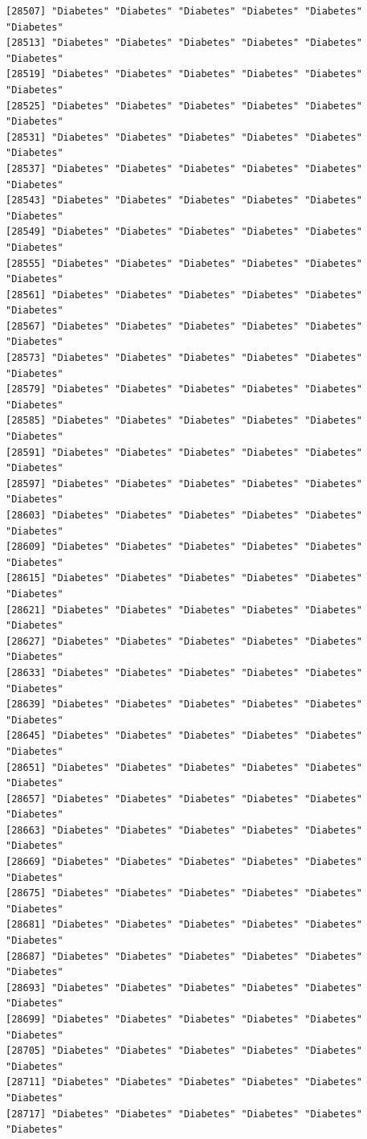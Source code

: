 \documentclass[
  letterpaper,
  DIV=11,
  numbers=noendperiod]{scrartcl}
\begin{document}
\begin{verbatim}
[28507] "Diabetes" "Diabetes" "Diabetes" "Diabetes" "Diabetes" "Diabetes"
[28513] "Diabetes" "Diabetes" "Diabetes" "Diabetes" "Diabetes" "Diabetes"
[28519] "Diabetes" "Diabetes" "Diabetes" "Diabetes" "Diabetes" "Diabetes"
[28525] "Diabetes" "Diabetes" "Diabetes" "Diabetes" "Diabetes" "Diabetes"
[28531] "Diabetes" "Diabetes" "Diabetes" "Diabetes" "Diabetes" "Diabetes"
[28537] "Diabetes" "Diabetes" "Diabetes" "Diabetes" "Diabetes" "Diabetes"
[28543] "Diabetes" "Diabetes" "Diabetes" "Diabetes" "Diabetes" "Diabetes"
[28549] "Diabetes" "Diabetes" "Diabetes" "Diabetes" "Diabetes" "Diabetes"
[28555] "Diabetes" "Diabetes" "Diabetes" "Diabetes" "Diabetes" "Diabetes"
[28561] "Diabetes" "Diabetes" "Diabetes" "Diabetes" "Diabetes" "Diabetes"
[28567] "Diabetes" "Diabetes" "Diabetes" "Diabetes" "Diabetes" "Diabetes"
[28573] "Diabetes" "Diabetes" "Diabetes" "Diabetes" "Diabetes" "Diabetes"
[28579] "Diabetes" "Diabetes" "Diabetes" "Diabetes" "Diabetes" "Diabetes"
[28585] "Diabetes" "Diabetes" "Diabetes" "Diabetes" "Diabetes" "Diabetes"
[28591] "Diabetes" "Diabetes" "Diabetes" "Diabetes" "Diabetes" "Diabetes"
[28597] "Diabetes" "Diabetes" "Diabetes" "Diabetes" "Diabetes" "Diabetes"
[28603] "Diabetes" "Diabetes" "Diabetes" "Diabetes" "Diabetes" "Diabetes"
[28609] "Diabetes" "Diabetes" "Diabetes" "Diabetes" "Diabetes" "Diabetes"
[28615] "Diabetes" "Diabetes" "Diabetes" "Diabetes" "Diabetes" "Diabetes"
[28621] "Diabetes" "Diabetes" "Diabetes" "Diabetes" "Diabetes" "Diabetes"
[28627] "Diabetes" "Diabetes" "Diabetes" "Diabetes" "Diabetes" "Diabetes"
[28633] "Diabetes" "Diabetes" "Diabetes" "Diabetes" "Diabetes" "Diabetes"
[28639] "Diabetes" "Diabetes" "Diabetes" "Diabetes" "Diabetes" "Diabetes"
[28645] "Diabetes" "Diabetes" "Diabetes" "Diabetes" "Diabetes" "Diabetes"
[28651] "Diabetes" "Diabetes" "Diabetes" "Diabetes" "Diabetes" "Diabetes"
[28657] "Diabetes" "Diabetes" "Diabetes" "Diabetes" "Diabetes" "Diabetes"
[28663] "Diabetes" "Diabetes" "Diabetes" "Diabetes" "Diabetes" "Diabetes"
[28669] "Diabetes" "Diabetes" "Diabetes" "Diabetes" "Diabetes" "Diabetes"
[28675] "Diabetes" "Diabetes" "Diabetes" "Diabetes" "Diabetes" "Diabetes"
[28681] "Diabetes" "Diabetes" "Diabetes" "Diabetes" "Diabetes" "Diabetes"
[28687] "Diabetes" "Diabetes" "Diabetes" "Diabetes" "Diabetes" "Diabetes"
[28693] "Diabetes" "Diabetes" "Diabetes" "Diabetes" "Diabetes" "Diabetes"
[28699] "Diabetes" "Diabetes" "Diabetes" "Diabetes" "Diabetes" "Diabetes"
[28705] "Diabetes" "Diabetes" "Diabetes" "Diabetes" "Diabetes" "Diabetes"
[28711] "Diabetes" "Diabetes" "Diabetes" "Diabetes" "Diabetes" "Diabetes"
[28717] "Diabetes" "Diabetes" "Diabetes" "Diabetes" "Diabetes" "Diabetes"

\end{verbatim}
\end{document}
